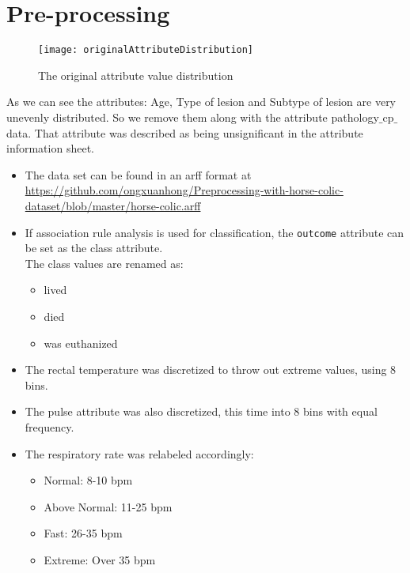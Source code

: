 \section{Pre-processing}

\begin{figure}[h!]
\centering
\texttt{[image: originalAttributeDistribution]}
\caption{The original attribute value distribution}
\end{figure}

\noindent
As we can see the attributes: Age, Type of lesion and Subtype of lesion are very unevenly distributed. So we remove them along with the attribute pathology$\_$cp$\_$data. That attribute was described as being unsignificant in the attribute information sheet.

\begin{itemize}

\item The data set can be found in an arff format at \\ \href{github.com/ongxuanhong/Preprocessing-with-horse-colic-dataset/blob/master/horse-colic.arff}{https://github.com/ongxuanhong/Preprocessing-with-horse-colic-dataset/blob/master/horse-colic.arff}

\item If association rule analysis is used for classification, the \verb|outcome| attribute can be set as the class attribute.\\
The class values are renamed as:
\begin{itemize}
\item lived
\item died
\item was euthanized
\end{itemize}

\item The rectal temperature was discretized to throw out extreme values, using 8 bins.

\item The pulse attribute was also discretized, this time into 8 bins with equal frequency.

\item The respiratory rate was relabeled accordingly:
\begin{itemize}
\item Normal: 8-10 bpm
\item Above Normal: 11-25 bpm
\item Fast: 26-35 bpm
\item Extreme: Over 35 bpm
\end{itemize}


\end{itemize}
